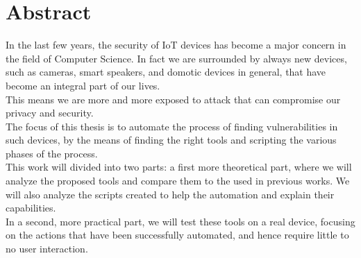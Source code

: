 \chapter*{Abstract} %
\label{abtract}


In the last few years, the security of IoT devices has become a major concern
in the field of Computer Science. In fact we are surrounded by always
new devices, such as cameras, smart speakers, and domotic devices in general,
that have become an integral part of our lives. \\
This means we are more and more exposed to attack that can compromise our
privacy and security. \\
The focus of this thesis is to automate the process of finding vulnerabilities
in such devices, by the means of finding the right tools and scripting the
various phases of the process. \\
This work will divided into two parts: a first more theoretical part, where
we will analyze the proposed tools and compare them to the used in previous works.
We will also analyze the scripts created to help the automation and explain their capabilities. \\
In a second, more practical part, we will test these tools on a real device,
focusing on the actions that have been successfully automated, and hence require
little to no user interaction. \\ 



